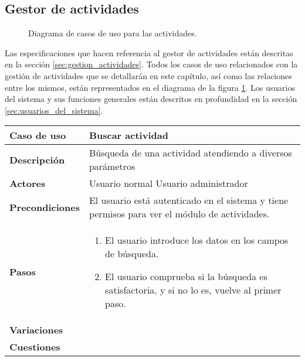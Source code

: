\subsection{Gestor de actividades}

\begin{figure}
\centering
{}
\caption{Diagrama de casos de uso para las actividades.}
\label{fig:CU_actividades}
\end{figure}

Las especificaciones que hacen referencia al gestor de actividades están
descritas en la sección \ref{sec:gestion_actividades}. Todos los casos de uso
relacionados con la gestión de actividades que se detallarán en este capítulo,
así como las relaciones entre los mismos, están representados en el diagrama de
la figura \ref{fig:CU_actividades}. Los usuarios del sistema y sus funciones
generales están descritos en profundidad en la sección
\ref{sec:usuarios_del_sistema}.

\begin{tabular}{|p{1.25in}|p{3.65in}|}\hline
\textbf{Caso de uso} & \textbf{Buscar actividad}\\\hline\hline
\textbf{Descripción} & Búsqueda de una actividad atendiendo a diversos
parámetros\\\hline
\textbf{Actores} & Usuario normal \newline Usuario administrador\\\hline
\textbf{Precondiciones} & El usuario está autenticado en el sistema y
tiene permisos para ver el módulo de actividades. \\\hline
\textbf{Pasos} &
  \begin{enumerate}
   \item El usuario introduce los datos en los campos de búsqueda.
   \item El usuario comprueba si la búsqueda es satisfactoria, y si no lo es,
vuelve al primer paso.
  \end{enumerate}
\\\hline
\textbf{Variaciones} & \\\hline
\textbf{Cuestiones} & \\\hline
\end{tabular}

